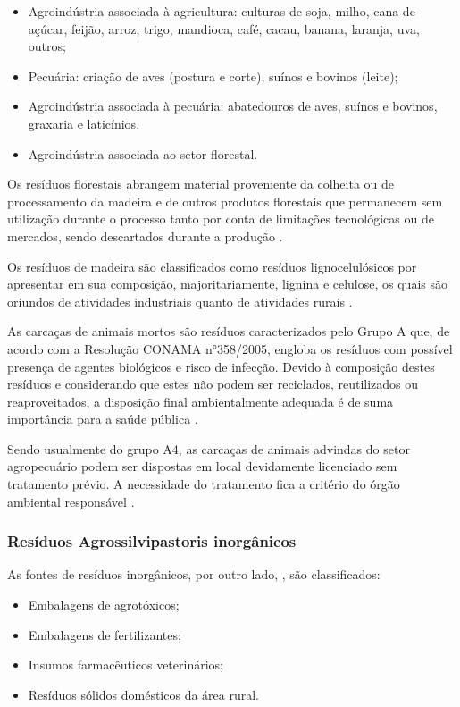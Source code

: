 \begin{itemize}
	\item Agroindústria associada à agricultura: culturas de soja, milho, cana de açúcar, feijão, arroz, trigo, mandioca, café, cacau, banana, laranja, uva, outros;
	\item Pecuária: criação de aves (postura e corte), suínos e bovinos (leite);
	\item Agroindústria associada à pecuária: abatedouros de aves, suínos e bovinos, graxaria e laticínios.
	\item Agroindústria associada ao setor florestal.
\end{itemize}

Os resíduos florestais abrangem material proveniente da colheita ou de processamento da madeira e de outros produtos florestais que permanecem sem utilização durante o processo tanto por conta de limitações tecnológicas ou de mercados, sendo descartados durante a produção \cite{Nolasco2000}. 

Os resíduos de madeira são classificados como resíduos lignocelulósicos por apresentar em sua composição, majoritariamente, lignina e celulose, os quais são oriundos de atividades industriais quanto de atividades rurais \cite{TEIXEIRA2005}.

As carcaças de animais mortos são resíduos caracterizados pelo Grupo A que, de acordo com a Resolução CONAMA n°358/2005, engloba os resíduos com possível presença de agentes biológicos e risco de infecção. Devido à composição destes resíduos e considerando que estes não podem ser reciclados, reutilizados ou reaproveitados, a disposição final ambientalmente adequada é de suma importância para a saúde pública \cite{conama:358}.

Sendo usualmente do grupo A4, as carcaças de animais advindas do setor agropecuário podem ser dispostas em local devidamente licenciado sem tratamento prévio. A necessidade do tratamento fica a critério do órgão ambiental responsável \cite{conama:358}.

\subsubsection{Resíduos Agrossilvipastoris inorgânicos}

As fontes de resíduos inorgânicos, por outro lado, \cite{MMA2012}, são classificados:

\begin{itemize}
	\item 	Embalagens de agrotóxicos;
	\item   Embalagens de fertilizantes;
	\item 	Insumos farmacêuticos veterinários;
	\item   Resíduos sólidos domésticos da área rural.
\end{itemize}

